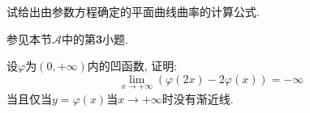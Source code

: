 \begin{quizb}
\woe 试给出由参数方程确定的平面曲线曲率的计算公式.
\begin{solution}
参见本节\(\boldsymbol{\mathcal{A}}\)中的第\textbf{3}小题.
\end{solution}
\woe 设\(\varphi\)为\((0,+\infty)\)内的凹函数, 证明:\[\lim_{x\rightarrow+\infty}\left(\varphi(2x)-2\varphi(x)\right)=-\infty\]当且仅当\(y=\varphi(x)\)当\(x\rightarrow+\infty\)时没有渐近线.
\end{quizb}